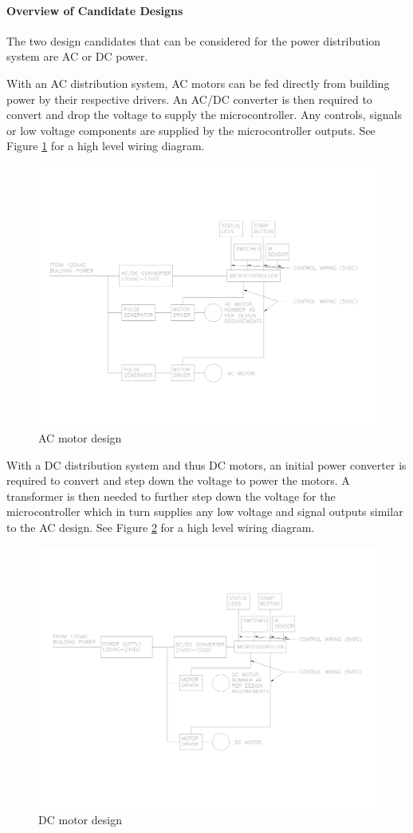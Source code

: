 \documentclass[11pt]{article}
\newcommand{\subsubsubsection}[1]{\paragraph{#1}\mbox{}}
\begin{document}
\subsubsubsection{Overview of Candidate Designs}

\noindent
The two design candidates that can be considered for the power distribution system are AC or DC power.

With an AC distribution system, AC motors can be fed directly from building power by their respective drivers.
An AC/DC converter is then required to convert and drop the voltage to supply the microcontroller.
Any controls, signals or low voltage components are supplied by the microcontroller outputs.
See Figure \ref{fig:ac} for a high level wiring diagram.

\begin{figure}[H]
  \centering
  \includegraphics[width=0.6\linewidth]{res/ac.png}
  \caption{AC motor design}
  \label{fig:ac}
\end{figure}
 
With a DC distribution system and thus DC motors, an initial power converter is required to convert and step down the voltage to power the motors.
A transformer is then needed to further step down the voltage for the microcontroller which in turn supplies any low voltage and signal outputs similar to the AC design.
See Figure \ref{fig:dc} for a high level wiring diagram.

\begin{figure}[H]
  \centering
  \includegraphics[width=0.6\linewidth]{res/dc.png}
  \caption{DC motor design}
  \label{fig:dc}
\end{figure}
\end{document}

